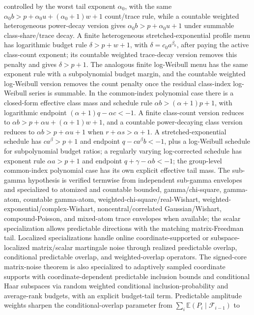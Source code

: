 \documentclass[11pt]{article}
\begin{document}
controlled by the worst tail exponent \(\alpha_0\), with the same
\(\alpha_0 b>p+\alpha_0 u+(\alpha_0+1)w+1\) count/trace rule, while a
countable weighted heterogeneous power-decay version gives
\(\alpha_0 b>p+\alpha_0 u+1\) under summable class-share/trace decay.  A finite
heterogeneous stretched-exponential profile menu has logarithmic budget rule
\(\delta>p+w+1\), with \(\delta=c_0a^{\beta_0}\), after paying the active
class-count exponent; its countable weighted trace-decay version removes this
penalty and gives \(\delta>p+1\).  The analogous finite log-Weibull menu has
the same exponent rule with a subpolynomial budget margin, and the countable
weighted log-Weibull version removes the count penalty once the residual
class-index log-Weibull series is summable.  In the
common-index polynomial case there is a closed-form effective class mass and
schedule rule
\(\alpha b>(\alpha+1)p+1\), with logarithmic endpoint
\((\alpha+1)q-\alpha c<-1\).  A finite class-count version reduces to
\(\alpha b>p+\alpha u+(\alpha+1)w+1\), and a countable power-decaying class
version reduces to \(\alpha b>p+\alpha u+1\) when
\(r+\alpha s>\alpha+1\).
A stretched-exponential schedule has \(ca^\beta>p+1\) and endpoint
\(q-ca^\beta b<-1\), plus a log-Weibull schedule for subpolynomial budget
ratios; a regularly varying log-corrected schedule has exponent rule
\(\alpha a>p+1\) and endpoint \(q+\gamma-\alpha b<-1\); the group-level
common-index polynomial case has its own explicit effective tail mass.
The sub-gamma hypothesis is
verified termwise from independent sub-gamma envelopes and specialized to
atomized and countable bounded, gamma/chi-square, gamma-atom, countable gamma-atom,
weighted-chi-square/real-Wishart,
weighted-exponential/complex-Wishart, noncentral/correlated Gaussian/Wishart,
compound-Poisson, and mixed-atom trace
envelopes when available;
the scalar specialization allows predictable directions with the matching
matrix-Freedman tail.  Localized specializations handle online
coordinate-supported or subspace-localized matrix/scalar martingale noise through
realized predictable overlap, conditional predictable overlap, and
weighted-overlap operators.
The signed-core matrix-noise theorem is also specialized to adaptively sampled
coordinate supports with coordinate-dependent predictable inclusion bounds and
conditional Haar subspaces via random weighted conditional inclusion-probability
and average-rank budgets, with an explicit budget-tail term.
Predictable amplitude weights sharpen the conditional-overlap parameter from
\(\sum_i\mathbb E(P_i\mid\mathcal{F}_{i-1})\) to
\end{document}
